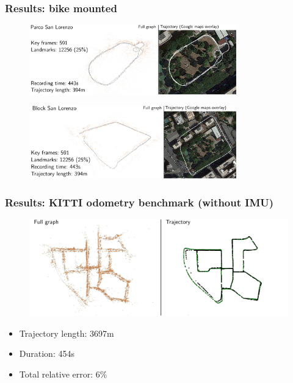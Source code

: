 \documentclass[11pt]{beamer}
\begin{document}
\begin{frame}
\frametitle{Results: bike mounted}
\begin{figure}[!htb]
\centering
\includegraphics[width=0.8\textwidth]{figures/results/san_lorenzo_parco.pdf}
\end{figure}
\begin{figure}[!htb]
\centering
\includegraphics[width=0.8\textwidth]{figures/results/san_lorenzo_street.pdf}
\end{figure}
\end{frame}

\begin{frame}
\frametitle{Results: KITTI odometry benchmark (without IMU)}
\begin{figure}[!htb]
\centering
\includegraphics[width=\textwidth]{figures/results/kitti_00.pdf}
\end{figure}
\begin{itemize}
\item Trajectory length: 3697m
\item Duration: 454s
\item Total relative error: 6\%
\end{itemize}
\end{frame}
\end{document}
